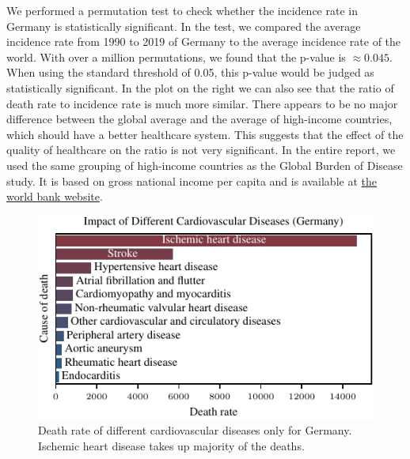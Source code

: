 We performed a permutation test to check whether the incidence rate in Germany is statistically significant. In the test, we compared the average incidence rate from 1990 to 2019 of Germany to the average incidence rate of the world. With over a million permutations, we found that the p-value is $\approx 0.045$. When using the standard threshold of 0.05, this p-value would be judged as statistically significant.
In the plot on the right we can also see that the ratio of death rate to incidence rate is much more similar. There appears to be no major difference between the global average and the average of 
high-income countries, which should have a better healthcare system. This suggests that the effect of the quality of healthcare on the ratio is not very significant. In the entire report, we used the same grouping of high-income countries
as the Global Burden of Disease study. It is based on gross national income per capita and is available at \href{https://datahelpdesk.worldbank.org/knowledgebase/articles/906519-world-bank-country-and-lending-groups}{the world bank website}. 

\begin{figure}[h]
    \vskip 0.2in
    \begin{center}
    \centerline{\includegraphics[width=\columnwidth]{fig/fig_ImpactOfDifferentCVDs.pdf}}
    \caption{Death rate of different cardiovascular diseases only for Germany. Ischemic heart disease takes up majority of the deaths.}
    \label{Impact of Different CVDs}
    \end{center}
    \vskip -0.2in
\end{figure}

